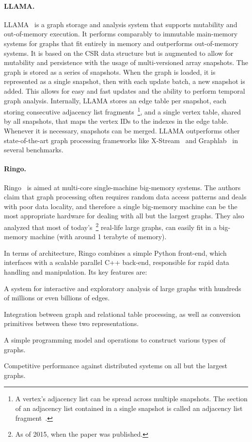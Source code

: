     \paragraph{\textbf{LLAMA}.} 
    LLAMA~\cite{paper:llama} is a graph storage and analysis system that supports mutability and out-of-memory execution. It performs comparably to immutable main-memory systems for graphs that fit entirely in memory and outperforms out-of-memory systems. It is based on the \gls{CSR} data structure but is augmented to allow for mutability and persistence with the usage of multi-versioned array snapshots. The graph is stored as a series of snapshots. When the graph is loaded, it is represented as a single snapshot, then with each update batch, a new snapshot is added. This allows for easy and fast updates and the ability to perform temporal graph analysis. Internally, LLAMA stores an edge table per snapshot, each storing consecutive adjacency list fragments~\footnote{A vertex's adjacency list can be spread across multiple snapshots. The section of an adjacency list contained in a single snapshot is called an adjacency list fragment~\cite{paper:llama}.}, and a single vertex table, shared by all snapshots, that maps the vertex IDs to the indexes in the edge table. Whenever it is necessary, snapshots can be merged. LLAMA outperforms other state-of-the-art graph processing frameworks like X-Stream~\cite{paper:xstream} and Graphlab~\cite{paper:graphlab} in several benchmarks.

    \paragraph{\textbf{Ringo}.} 
    Ringo~\cite{paper:ringo} is aimed at multi-core single-machine big-memory systems. The authors claim that graph processing often requires random data access patterns and deals with poor data locality, and therefore a single big-memory machine can be the most appropriate hardware for dealing with all but the largest graphs. They also analyzed that most of today's~\footnote{As of 2015, when the paper was published.} real-life large graphs, can easily fit in a big-memory machine (with around 1 terabyte of memory).

    In terms of architecture, Ringo combines a simple Python front-end, which interfaces with a scalable parallel C++ back-end, responsible for rapid data handling and manipulation.  Its key features are: 
    \begin{enumerate*}
        \item A system for interactive and exploratory analysis of large graphs with hundreds of millions or even billions of edges.
        \item Integration between graph and relational table processing, as well as conversion primitives between these two representations.
        \item A simple programming model and operations to construct various types of graphs.
        \item Competitive performance against distributed systems on all but the largest graphs.
    \end{enumerate*}

